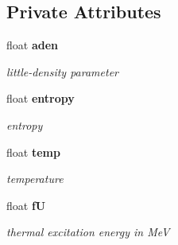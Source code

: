 \subsection*{Private Attributes}
\begin{CompactItemize}
\item 
float \bf{aden}\label{classCLevelDensity_1806204a907f25a442252c512adfbee8}

\begin{CompactList}\small\item\em little-density parameter \item\end{CompactList}\item 
float \bf{entropy}\label{classCLevelDensity_f678ed429f345194a54e903d1f0988dd}

\begin{CompactList}\small\item\em entropy \item\end{CompactList}\item 
float \bf{temp}\label{classCLevelDensity_4a16e3d0e061122756fd2fd08475cf71}

\begin{CompactList}\small\item\em temperature \item\end{CompactList}\item 
float \bf{f\-U}\label{classCLevelDensity_7d128ac299d6d28df0aeca5ee920756a}

\begin{CompactList}\small\item\em thermal excitation energy in Me\-V \item\end{CompactList}\end{CompactItemize}
